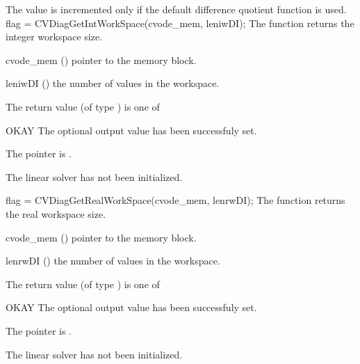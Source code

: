 {
  The value  is incremented only if the default 
   difference quotient function is used.
}
%
%
{
  flag = CVDiagGetIntWorkSpace(cvode\_mem, leniwDI);
}
{
  The function  returns the
  {\cvdiag} integer workspace size.
}
{
  \begin{args}
  \item[cvode\_mem] ()
    pointer to the {\cvodes} memory block.
  \item[leniwDI] ()
    the number of  values in the {\cvdiag} workspace.
  \end{args}
}
{
  The return value  (of type ) is one of
  \begin{args}
  \item[OKAY] 
    The optional output value has been successfuly set.
  \item[\Id{LIN\_NO\_MEM}]
    The  pointer is .
  \item[\Id{LIN\_NO\_LMEM}]
    The {\cvdiag} linear solver has not been initialized.
  \end{args}
}
{}
{
  flag = CVDiagGetRealWorkSpace(cvode\_mem, lenrwDI);
}
{
  The function  returns the
  {\cvdiag} real workspace size.
}
{
  \begin{args}
  \item[cvode\_mem] ()
    pointer to the {\cvodes} memory block.
  \item[lenrwDI] ()
    the number of  values in the {\cvdiag} workspace.
  \end{args}
}
{
  The return value  (of type ) is one of
  \begin{args}
  \item[OKAY] 
    The optional output value has been successfuly set.
  \item[\Id{LIN\_NO\_MEM}]
    The  pointer is .
  \item[\Id{LIN\_NO\_LMEM}]
    The {\cvdiag} linear solver has not been initialized.
  \end{args}
}
